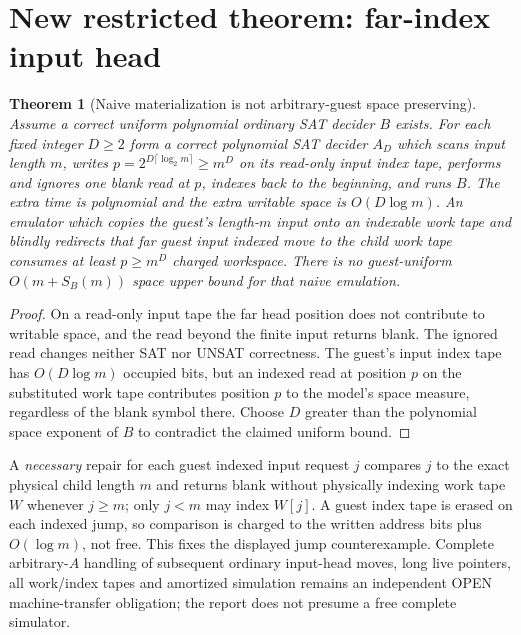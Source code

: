 \documentclass[10pt]{article}
\newtheorem{theorem}{Theorem}
\begin{document}
\section{New restricted theorem: far-index input head}
\begin{theorem}[Naive materialization is not arbitrary-guest space preserving]
Assume a correct uniform polynomial ordinary SAT decider $B$ exists. For each fixed integer $D\ge2$ form a correct polynomial SAT decider $A_D$ which scans input length $m$, writes $p=2^{D\lceil\log_2m\rceil}\ge m^D$ on its read-only \emph{input} index tape, performs and ignores one blank read at $p$, indexes back to the beginning, and runs $B$. The extra time is polynomial and the extra writable space is $O(D\log m)$. An emulator which copies the guest's length-$m$ input onto an indexable \emph{work} tape and blindly redirects that far guest input indexed move to the child work tape consumes at least $p\ge m^D$ charged workspace. There is no guest-uniform $O(m+S_B(m))$ space upper bound for that naive emulation.
\end{theorem}
\begin{proof}
On a read-only input tape the far head position does not contribute to writable space, and the read beyond the finite input returns blank. The ignored read changes neither SAT nor UNSAT correctness. The guest's input index tape has $O(D\log m)$ occupied bits, but an indexed read at position $p$ on the substituted work tape contributes position $p$ to the model's space measure, regardless of the blank symbol there. Choose $D$ greater than the polynomial space exponent of $B$ to contradict the claimed uniform bound.
\end{proof}
A \emph{necessary} repair for each guest indexed input request $j$ compares $j$ to the exact physical child length $m$ and returns blank without physically indexing work tape $W$ whenever $j\ge m$; only $j<m$ may index $W[j]$. A guest index tape is erased on each indexed jump, so comparison is charged to the written address bits plus $O(\log m)$, not free. This fixes the displayed jump counterexample. Complete arbitrary-$A$ handling of subsequent ordinary input-head moves, long live pointers, all work/index tapes and amortized simulation remains an independent OPEN machine-transfer obligation; the report does not presume a free complete simulator.
\end{document}
